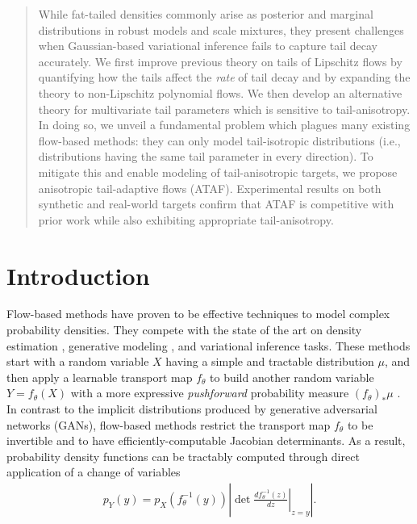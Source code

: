 \documentclass[nohyperref]{article}
\theoremstyle{plain}
\theoremstyle{definition}
\theoremstyle{remark}
\begin{document}
\printAffiliationsAndNotice{}  %

\begin{abstract}
    While fat-tailed densities commonly arise as posterior and marginal distributions in
    robust models and scale mixtures, they present challenges when Gaussian-based 
    variational inference fails to capture tail decay accurately. 
    We first improve previous theory on tails of Lipschitz flows 
    by quantifying how the tails affect the \emph{rate} of tail decay 
    and by expanding the theory to non-Lipschitz polynomial flows.
    We then develop an alternative theory for multivariate tail parameters which is 
    sensitive to tail-anisotropy. 
    In doing so, we unveil a fundamental problem which plagues many existing flow-based 
    methods: they can only model tail-isotropic distributions (i.e., distributions 
    having the same tail parameter in every direction).
    To mitigate this and enable modeling of tail-anisotropic targets, we propose 
    anisotropic tail-adaptive flows (ATAF).
    Experimental results on both synthetic and real-world targets confirm that ATAF 
    is competitive with prior work while also exhibiting appropriate tail-anisotropy.
\end{abstract}

\section{Introduction}
\label{sec:intro}


Flow-based methods 
\citep{papamakarios2021normalizing}
have proven to be effective techniques to model complex
probability densities. They compete with the state of the art on
density estimation \citep{huang2018neural,durkan2019neural,jaini2020tails},
generative modeling \citep{chen2019residual,kingma2018glow}, and variational inference \citep{kingma2016improved,agrawal2020advances} tasks.
These methods start with a random variable $X$ having a simple and tractable
distribution $\mu$, and then apply a learnable transport map $f_\theta$ to build
another random variable $Y = f_\theta(X)$ with a more expressive \emph{pushforward}
probability measure $(f_\theta)_\ast \mu$ \citep{papamakarios2021normalizing}.
In contrast to the implicit distributions \citep{huszar2017variational} produced by generative adversarial networks (GANs), flow-based methods restrict the transport map $f_\theta$ to be invertible and to have efficiently-computable Jacobian determinants.
As a result, probability density functions can be tractably computed
through direct application of a change of variables
\begin{align}
    \label{eq:change-of-variable}
    p_{Y}(y)
      = p_{X}(f_\theta^{-1}(y)) \left\lvert \det
        \left.\frac{d f_\theta^{-1}(z)}{dz} \right\vert_{z=y}
      \right\rvert .
\end{align}
\end{document}
